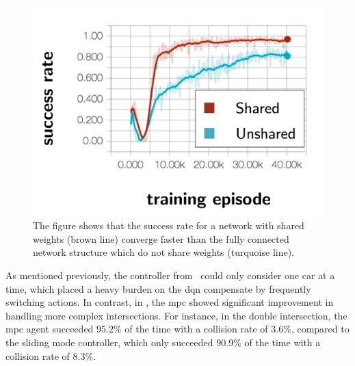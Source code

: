 \begin{figure}[!ht]
	\centering
	\includegraphics[width=0.7\columnwidth]{YourThesis/papers/lstm/figures/results_shared.png}
	\caption{The figure shows that the success rate for a network with shared weights (brown line) converge faster than the fully connected network structure which do not share weights (turquoise line).}
	\label{fig:results_shared}
\end{figure}

As mentioned previously, the controller from \paperLSTM \ could only consider one car at a time, which placed a heavy burden on the \gls{dqn} compensate by frequently switching actions. 
In contrast, in \paperMPC, the \gls{mpc} showed significant improvement in handling more complex intersections.
For instance, in the double intersection, the \gls{mpc} agent succeeded $95.2\%$ of the time with a collision rate of $3.6\%$, compared to the sliding mode controller, which only succeeded $90.9\%$ of the time with a collision rate of $8.3\%$.




